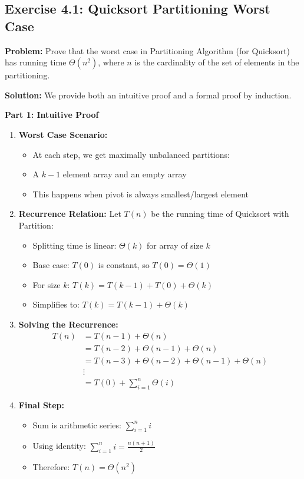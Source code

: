 \subsection{Exercise 4.1: Quicksort Partitioning Worst Case}
\textbf{Problem:} Prove that the worst case in Partitioning Algorithm (for Quicksort) has running time $\Theta(n^2)$, where $n$ is the cardinality of the set of elements in the partitioning.

\textbf{Solution:} We provide both an intuitive proof and a formal proof by induction.

\textbf{Part 1: Intuitive Proof}
\begin{enumerate}[leftmargin=*,noitemsep]
    \item \textbf{Worst Case Scenario:}
    \begin{itemize}[noitemsep]
        \item At each step, we get maximally unbalanced partitions:
        \item A $k-1$ element array and an empty array
        \item This happens when pivot is always smallest/largest element
    \end{itemize}

    \item \textbf{Recurrence Relation:}
    Let $T(n)$ be the running time of Quicksort with Partition:
    \begin{itemize}[noitemsep]
        \item Splitting time is linear: $\Theta(k)$ for array of size $k$
        \item Base case: $T(0)$ is constant, so $T(0) = \Theta(1)$
        \item For size $k$: $T(k) = T(k-1) + T(0) + \Theta(k)$
        \item Simplifies to: $T(k) = T(k-1) + \Theta(k)$
    \end{itemize}

    \item \textbf{Solving the Recurrence:}
    \begin{align*}
        T(n) &= T(n-1) + \Theta(n) \\
        &= T(n-2) + \Theta(n-1) + \Theta(n) \\
        &= T(n-3) + \Theta(n-2) + \Theta(n-1) + \Theta(n) \\
        &\vdots \\
        &= T(0) + \sum_{i=1}^n \Theta(i)
    \end{align*}

    \item \textbf{Final Step:}
    \begin{itemize}[noitemsep]
        \item Sum is arithmetic series: $\sum_{i=1}^n i$
        \item Using identity: $\sum_{i=1}^n i = \frac{n(n+1)}{2}$
        \item Therefore: $T(n) = \Theta(n^2)$
    \end{itemize}
\end{enumerate}

